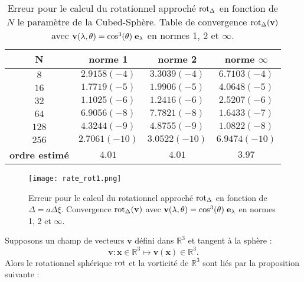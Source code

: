 \begin{table}[htbp]
\begin{center}
\begin{tabular}{|c||c|c|c|}
\hline
\textbf{N}  & \textbf{norme 1} & \textbf{norme 2} & \textbf{norme $\infty$} \\
\hline
\hline
$8$  & $2.9158(-4)$  & $3.3039(-4)$  & $6.7103(-4)$  \\
$16$ & $1.7719(-5)$  & $1.9906(-5)$  & $4.0648(-5)$  \\
$32$ & $1.1025(-6)$  & $1.2416(-6)$  & $2.5207(-6)$  \\
$64$ & $6.9056(-8)$  & $7.7821(-8)$  & $1.6433(-7)$  \\
$128$& $4.3244(-9)$  & $4.8755(-9)$  & $1.0822(-8)$  \\
$256$& $2.7061(-10)$ & $3.0522(-10)$ & $6.9474(-10)$ \\
\hline 
\hline
\textbf{ordre estimé}& $4.01$ & $4.01$ & $3.97$\\
\hline
\end{tabular}
\end{center}
\caption{Erreur pour le calcul du rotationnel approché $\text{rot}_{\Delta}$ en fonction de $N$ le paramètre de la Cubed-Sphère. Table de convergence $\text{rot}_{\Delta} ( \mathbf{v} )$ avec $\mathbf{v} ( \lambda, \theta ) = \cos^3 (\theta) \hspace{0.1cm} \mathbf{e}_{\lambda}$ en normes 1, 2 et $\infty$.}
\label{tab:rate_rot1}
\end{table} 

\begin{figure}[htbp]
\begin{center}
\texttt{[image: rate\_rot1.png]}
\end{center}
\caption{Erreur pour le calcul du rotationnel approché $\text{rot}_{\Delta}$ en fonction de $\Delta = a \Delta \xi$. Convergence $\text{rot}_{\Delta} ( \mathbf{v} )$ avec $\mathbf{v} ( \lambda, \theta ) = \cos^3 (\theta) \hspace{0.1cm} \mathbf{e}_{\lambda}$ en normes 1, 2 et $\infty$.}
\label{fig:rate_rot1}
\end{figure}


Supposons un champ de vecteurs $\mathbf{v}$ défini dans $\mathbb{R}^3$ et tangent à la sphère :
\begin{equation}
\mathbf{v} : \mathbf{x} \in \mathbb{R}^3 \mapsto \mathbf{v}(\mathbf{x}) \in \mathbb{R}^3.
\end{equation}
Alors le rotationnel sphérique $\text{rot}$ et la vorticité de $\mathbb{R}^3$ sont liés par la proposition suivante :

